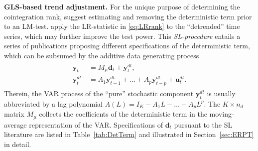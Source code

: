 \textbf{GLS-based trend adjustment.} For the unique purpose of determining the cointegration rank, \citet{SaikkonenLutkepohl2000a} suggest estimating and removing the deterministic term prior to an LM-test. \citet{SaikkonenLutkepohl2000c} apply the LR-statistic in \eqref{eq:LRrank} to the ``detrended'' time series, which may further improve the test power. This \textit{SL-procedure} entails a series of publications proposing different specifications of the deterministic term, which can be subsumed by the additive data generating process 
\begin{align} \label{eq:addDGP}
\begin{split}
	\boldsymbol{y}_{t} \ & = M_\mu \boldsymbol{d}_t + \boldsymbol{y}^{d \! t}_{t}, \\
	\boldsymbol{y}^{d \! t}_{t} \ & = A_{1} \boldsymbol{y}^{d \! t}_{t-1} + ... + A_{p} \boldsymbol{y}^{d \! t}_{t-p} + \boldsymbol{u}^{d \! t}_{t}.
\end{split}
\end{align}
Therein, the VAR process of the ``pure'' stochastic component $ \boldsymbol{y}^{d \! t}_{t} $ is usually abbreviated by a lag polynomial $ A(L) = I_K - A_1 L - \ldots - A_p L^p $. The $ K \times n_d $ matrix $ M_\mu $ collects the coefficients of the deterministic term in the moving-average representation of the VAR. Specifications of $ \boldsymbol{d}_t $ pursuant to the SL literature are listed in Table~\ref{tab:DetTerm} and illustrated in Section~\ref{sec:ERPT} in detail.

